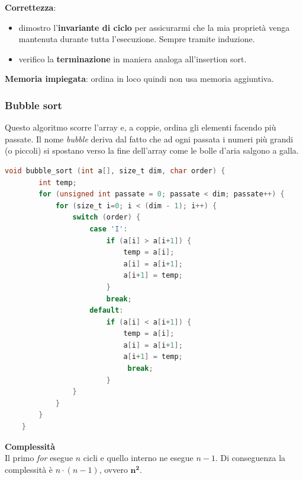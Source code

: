 \textbf{Correttezza}:
\begin{itemize}
	\item dimostro l'\textbf{invariante di ciclo} per assicurarmi che la mia proprietà venga mantenuta durante tutta l'esecuzione. Sempre tramite induzione.
	\item verifico la \textbf{terminazione} in maniera analoga all'insertion sort.
\end{itemize}
\textbf{Memoria impiegata}: ordina in loco quindi non usa memoria aggiuntiva.

\subsubsection{Bubble sort}
Questo algoritmo scorre l'array e, a coppie, ordina gli elementi facendo più passate. Il nome \emph{bubble} deriva dal fatto che ad ogni passata i numeri più grandi (o piccoli) si spostano verso la fine dell'array come le bolle d'aria salgono a galla.
\begin{lstlisting}[language=C, caption=Algoritmo bubble sort, mathescape=true]
	void bubble_sort (int a[], size_t dim, char order) {
		int temp;
		for (unsigned int passate = 0; passate < dim; passate++) {
			for (size_t i=0; i < (dim - 1); i++) {
				switch (order) {
					case 'I':
						if (a[i] > a[i+1]) {
							temp = a[i];
							a[i] = a[i+1];
							a[i+1] = temp;
						}
						break;
					default:
						if (a[i] < a[i+1]) {
							temp = a[i];
							a[i] = a[i+1];
							a[i+1] = temp;
							 break;
						}
				}
			}
		}
	}
\end{lstlisting}
\textbf{Complessità}\\
Il primo \emph{for} esegue $n$ cicli e quello interno ne esegue $n-1$. Di conseguenza la complessità è $n\cdot (n-1)$, ovvero $\mathbf{n^2}$.
